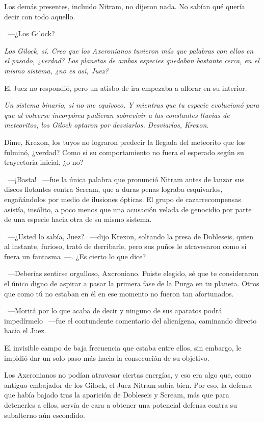 Los demás presentes, incluido Nitram, no dijeron nada. No sabían qué quería decir con todo aquello.

~---¿Los Gilock?

\emph{Los Gilock, sí. Creo que los Axcronianos tuvieron más que palabras con ellos en el pasado, ¿verdad? Los planetas de ambas especies quedaban bastante cerca, en el mismo sistema, ¿no es así, Juez?}

El Juez no respondió, pero un atisbo de ira empezaba a aflorar en su interior.

\emph{Un sistema binario, si no me equivoco. Y mientras que tu especie evolucionó para que al volverse incorpórea pudieran sobrevivir a las constantes lluvias de meteoritos, los Gilock optaron por desviarlos. Desviarlos, Krexon.}

\rquoti Dime, Krexon, los tuyos no lograron predecir la llegada del meteorito que los fulminó, ¿verdad? Como si su comportamiento no fuera el esperado según su trayectoria inicial, ¿o no?

~---¡Basta! ~---fue la única palabra que pronunció Nitram antes de lanzar sus discos flotantes contra Scream, que a duras penas lograba esquivarlos, engañándolos por medio de ilusiones ópticas. El grupo de cazarrecompensas asistía, insólito, a poco menos que una acusación velada de genocidio por parte de una especie hacia otra de su mismo sistema.

~---¿Usted lo sabía, Juez? ~---dijo Krexon, soltando la presa de Dobleseis, quien al instante, furioso, trató de derribarle, pero sus puños le atravesaron como si fuera un fantasma~---. ¿Es cierto lo que dice?

~---Deberías sentirse orgulloso, Axcroniano. Fuiste elegido, sé que te consideraron el único digno de aspirar a pasar la primera fase de la Purga en tu planeta. Otros que como tú no estaban en él en ese momento no fueron tan afortunados.

~---Morirá por lo que acaba de decir y ninguno de sus aparatos podrá impedírmelo ~---fue el contundente comentario del alienígena, caminando directo hacia el Juez.

El invisible campo de baja frecuencia que estaba entre ellos, sin embargo, le impidió dar un solo paso más hacia la consecución de su objetivo.

Los Axcronianos no podían atravesar ciertas energías, y eso era algo que, como antiguo embajador de los Gilock, el Juez Nitram sabía bien. Por eso, la defensa que había bajado tras la aparición de Dobleseis y Scream, más que para detenerles a ellos, servía de cara a obtener una potencial defensa contra su subalterno aún escondido.

